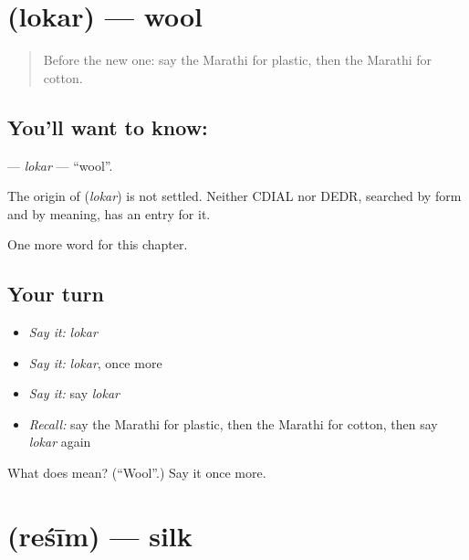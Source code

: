 \section[\texorpdfstring{\mr{लोकर} (lokar)}{लोकर (lokar)}]{ (lokar) — wool}

\label{lesson:MR-C214-lokar}



\begin{quote}
Before the new one: say the Marathi for plastic, then the Marathi for cotton.
\end{quote}

\subsection*{You'll want to know: }
\textbf{} — \emph{lokar} — \textquotedblleft{}wool\textquotedblright{}.

\begin{cousinweb}
The origin of \textbf{} (\emph{lokar}) is not settled. Neither CDIAL nor DEDR, searched by form and by meaning, has an entry for it.
\end{cousinweb}

\begin{grammarlens}[title={What you've built}]
One more word for this chapter.
\end{grammarlens}

\subsection*{Your turn}
\begin{itemize}
\raggedright
  \item \emph{Say it:} \emph{lokar}
  \item \emph{Say it:} \emph{lokar}, once more
  \item \emph{Say it:} say \emph{lokar}
  \item \emph{Recall:} say the Marathi for plastic, then the Marathi for cotton, then say \emph{lokar} again
\end{itemize}

\begin{tcolorbox}[breakable,colback=teal!4,colframe=teal!35!black,title={Before you move on}]
What does  mean? (\textquotedblleft{}Wool\textquotedblright{}.) Say it once more.
\end{tcolorbox}
\section[\texorpdfstring{\mr{रेशीम} (reśīm)}{रेशीम (reśīm)}]{ (reśīm) — silk}

